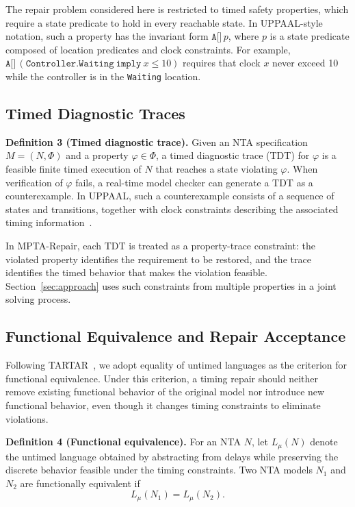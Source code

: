 The repair problem considered here is restricted to timed safety
properties, which require a state predicate to hold in every reachable
state. In UPPAAL-style notation, such a property has the invariant form
$\texttt{A[]}\,p$, where $p$ is a state predicate composed of location
predicates and clock constraints. For example,
$\texttt{A[]}\,(\texttt{Controller.Waiting}\ \texttt{imply}\ x\leq 10)$
requires that clock $x$ never exceed 10 while the controller is in the
\texttt{Waiting} location.

\subsection{Timed Diagnostic Traces}

\noindent\textbf{Definition 3 (Timed diagnostic trace).}
Given an NTA specification $M=(N,\Phi)$ and a
property $\varphi\in\Phi$, a timed diagnostic trace (TDT) for
$\varphi$ is a feasible finite timed execution of $N$ that
reaches a state violating $\varphi$.
When verification of $\varphi$ fails, a real-time model checker can
generate a TDT as a counterexample. In UPPAAL, such a counterexample
consists of a sequence of states and transitions, together with clock
constraints describing the associated timing
information~\cite{larsen1997uppaal}.

In MPTA-Repair, each TDT is treated as a property-trace constraint:
the violated property identifies the requirement to be restored, and
the trace identifies the timed behavior that makes the violation
feasible. Section~\ref{sec:approach} uses such constraints from
multiple properties in a joint solving process.

\subsection{Functional Equivalence and Repair Acceptance}

Following TARTAR~\cite{kolbl2019clock}, we adopt equality of untimed
languages as the criterion for functional equivalence. Under this
criterion, a timing repair should neither remove existing functional
behavior of the original model nor introduce new functional behavior,
even though it changes timing constraints to eliminate violations.

\noindent\textbf{Definition 4 (Functional equivalence).}
For an NTA $N$, let $L_\mu(N)$ denote the untimed language obtained by
abstracting from delays while preserving the discrete behavior feasible
under the timing constraints. Two NTA models $N_1$ and $N_2$ are
functionally equivalent if
\begin{equation}
L_\mu(N_1)=L_\mu(N_2).
\end{equation}

